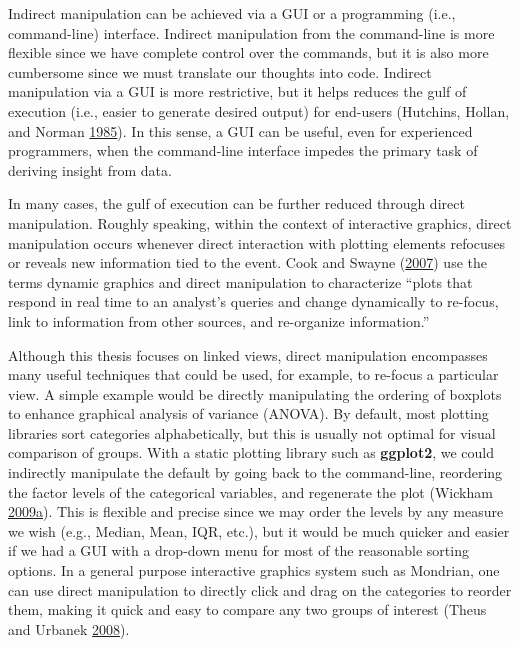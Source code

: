 \documentclass[12pt,]{isuthesis}
\begin{document}
Indirect manipulation can be achieved via a GUI or a programming (i.e.,
command-line) interface. Indirect manipulation from the command-line is
more flexible since we have complete control over the commands, but it
is also more cumbersome since we must translate our thoughts into code.
Indirect manipulation via a GUI is more restrictive, but it helps
reduces the gulf of execution (i.e., easier to generate desired output)
for end-users (Hutchins, Hollan, and Norman
\protect\hyperlink{ref-Hutchins:1985wu}{1985}). In this sense, a GUI can
be useful, even for experienced programmers, when the command-line
interface impedes the primary task of deriving insight from data.

In many cases, the gulf of execution can be further reduced through
direct manipulation. Roughly speaking, within the context of interactive
graphics, direct manipulation occurs whenever direct interaction with
plotting elements refocuses or reveals new information tied to the
event. Cook and Swayne (\protect\hyperlink{ref-ggobi:2007}{2007}) use
the terms dynamic graphics and direct manipulation to characterize
``plots that respond in real time to an analyst's queries and change
dynamically to re-focus, link to information from other sources, and
re-organize information.''

Although this thesis focuses on linked views, direct manipulation
encompasses many useful techniques that could be used, for example, to
re-focus a particular view. A simple example would be directly
manipulating the ordering of boxplots to enhance graphical analysis of
variance (ANOVA). By default, most plotting libraries sort categories
alphabetically, but this is usually not optimal for visual comparison of
groups. With a static plotting library such as \textbf{ggplot2}, we
could indirectly manipulate the default by going back to the
command-line, reordering the factor levels of the categorical variables,
and regenerate the plot (Wickham
\protect\hyperlink{ref-ggplot2}{2009}\protect\hyperlink{ref-ggplot2}{a}).
This is flexible and precise since we may order the levels by any
measure we wish (e.g., Median, Mean, IQR, etc.), but it would be much
quicker and easier if we had a GUI with a drop-down menu for most of the
reasonable sorting options. In a general purpose interactive graphics
system such as Mondrian, one can use direct manipulation to directly
click and drag on the categories to reorder them, making it quick and
easy to compare any two groups of interest (Theus and Urbanek
\protect\hyperlink{ref-mondrianbook}{2008}).
\end{document}
